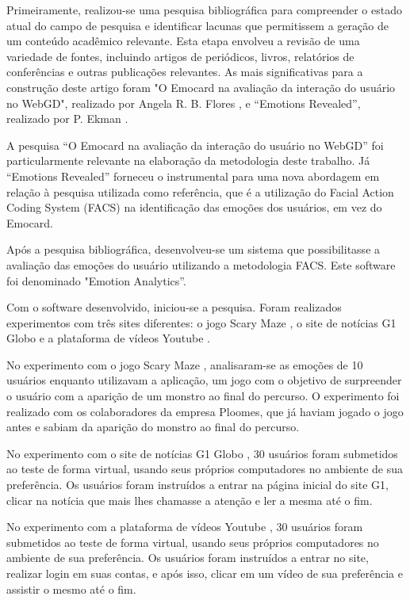 Primeiramente, realizou-se uma pesquisa bibliográfica para compreender o estado atual do campo de pesquisa e identificar lacunas que permitissem a geração de um conteúdo acadêmico relevante. Esta etapa envolveu a revisão de uma variedade de fontes, incluindo artigos de periódicos, livros, relatórios de conferências e outras publicações relevantes. As mais significativas para a construção deste artigo foram "O Emocard na avaliação da interação do usuário no WebGD", realizado por Angela R. B. Flores \cite{3}, e “Emotions Revealed”, realizado por P. Ekman \cite{5}.

A pesquisa “O Emocard na avaliação da interação do usuário no WebGD” \cite{5} foi particularmente relevante na elaboração da metodologia deste trabalho. Já “Emotions Revealed” \cite{3} forneceu o instrumental para uma nova abordagem em relação à pesquisa utilizada como referência, que é a utilização do Facial Action Coding System (FACS) \cite{5} na identificação das emoções dos usuários, em vez do Emocard.

Após a pesquisa bibliográfica, desenvolveu-se um sistema que possibilitasse a avaliação das emoções do usuário utilizando a metodologia FACS. Este software foi denominado "Emotion Analytics”.

Com o software desenvolvido, iniciou-se a pesquisa. Foram realizados experimentos com três sites diferentes: o jogo Scary Maze \cite{18}, o site de notícias G1 Globo \cite{19} e a plataforma de vídeos Youtube \cite{20}.

No experimento com o jogo Scary Maze \cite{18}, analisaram-se as emoções de 10 usuários enquanto utilizavam a aplicação, um jogo com o objetivo de surpreender o usuário com a aparição de um monstro ao final do percurso. O experimento foi realizado com os colaboradores da empresa Ploomes, que já haviam jogado o jogo antes e sabiam da aparição do monstro ao final do percurso.

No experimento com o site de notícias G1 Globo \cite{19}, 30 usuários foram submetidos ao teste de forma virtual, usando seus próprios computadores no ambiente de sua preferência. Os usuários foram instruídos a entrar na página inicial do site G1, clicar na notícia que mais lhes chamasse a atenção e ler a mesma até o fim.

No experimento com a plataforma de vídeos Youtube \cite{20}, 30 usuários foram submetidos ao teste de forma virtual, usando seus próprios computadores no ambiente de sua preferência. Os usuários foram instruídos a entrar no site, realizar login em suas contas, e após isso, clicar em um vídeo de sua preferência e assistir o mesmo até o fim.

